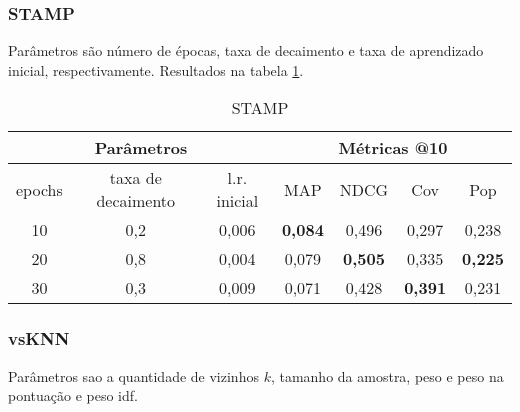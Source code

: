 \subsubsection{STAMP}
Parâmetros são número de épocas, taxa de decaimento e taxa de aprendizado inicial, respectivamente.
Resultados na tabela \ref{opt:stamp_rem}.

\begin{table}[htbp]
  \centering
  \begin{tabular}{|c|c|c|c|c|c|c|}
    \hline
      \multicolumn{3}{|c|}{Parâmetros} & \multicolumn{4}{c|}{Métricas @10} \\
      \hline
      epochs & taxa de decaimento & l.r. inicial & MAP & NDCG & Cov & Pop \\
      \hline
      10 & 0,2 & 0,006 & \textbf{0,084} & 0,496 & 0,297 & 0,238 \\
      \hline
      20 & 0,8 & 0,004 & 0,079 & \textbf{0,505} & 0,335 & \textbf{0,225} \\
      \hline
      30 & 0,3 & 0,009 & 0,071 & 0,428 & \textbf{0,391} & 0,231 \\
      \hline
\end{tabular}
      \caption{STAMP}
      \label{opt:stamp_rem}
\end{table}

\subsubsection{vsKNN}
Parâmetros sao a quantidade de vizinhos $k$, tamanho da amostra, peso e peso na
pontuação e peso idf.


